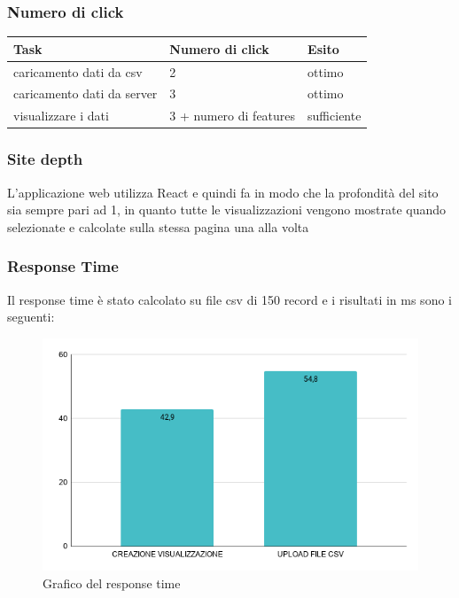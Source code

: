 \subsubsection{Numero di click}

\begin{longtabu} to \textwidth {| X[0.2,c m] | X[0.1,c m]| X[0.1,c m]| }
    \hline
    \textbf{Task} &
    \textbf{Numero di click} &
    \textbf{Esito}\\
    \hline
    caricamento dati da csv & 2 & ottimo \\ 
    \hline
    caricamento dati da server & 3 & ottimo \\
    \hline
    visualizzare i dati & 3 + numero di features & sufficiente \\
    \hline 
    \end{longtabu}


\subsubsection{Site depth}
    L'applicazione web utilizza React e quindi fa in modo che la profondità del sito sia sempre pari ad 1, in quanto tutte le visualizzazioni vengono mostrate quando selezionate e calcolate sulla stessa pagina una alla volta

    
\subsubsection{Response Time}
    Il response time è stato calcolato su file csv di 150 record e i risultati in ms sono i seguenti:

    \begin{figure}[H]
        \centering
        \includegraphics[width=10 cm]{source/sections/images/response-time.png}
        \caption{Grafico del response time}
    \end{figure}
  

